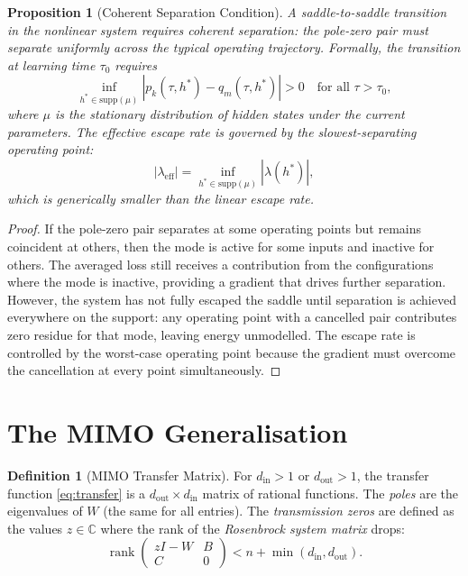 \documentclass[11pt,a4paper]{article}
\newtheorem{proposition}[theorem]{Proposition}
\theoremstyle{definition}
\newtheorem{definition}[theorem]{Definition}
\DeclareMathOperator{\rank}{rank}
\newcommand{\C}{\mathbb{C}}
\begin{document}
\begin{proposition}[Coherent Separation Condition]%
\label{prop:coherent}
A saddle-to-saddle transition in the nonlinear system requires
\emph{coherent separation}: the pole-zero pair must separate
uniformly across the typical operating trajectory. Formally,
the transition at learning time $\tau_0$ requires
\begin{equation}
  \inf_{h^* \in \mathrm{supp}(\mu)}
  |p_k(\tau, h^*) - q_m(\tau, h^*)| > 0
  \quad \text{for all } \tau > \tau_0,
\end{equation}
where $\mu$ is the stationary distribution of hidden states under
the current parameters. The effective escape rate is governed by
the slowest-separating operating point:
\begin{equation}
  |\lambda_{\mathrm{eff}}| = \inf_{h^* \in \mathrm{supp}(\mu)}
  |\lambda(h^*)|,
\end{equation}
which is generically smaller than the linear escape rate.
\end{proposition}

\begin{proof}
If the pole-zero pair separates at some operating points but
remains coincident at others, then the mode is active for some
inputs and inactive for others. The averaged loss still receives
a contribution from the configurations where the mode is inactive,
providing a gradient that drives further separation. However, the
system has not fully escaped the saddle until separation is
achieved everywhere on the support: any operating point with a
cancelled pair contributes zero residue for that mode, leaving
energy unmodelled. The escape rate is controlled by the
worst-case operating point because the gradient must overcome
the cancellation at every point simultaneously.
\end{proof}

\section{The MIMO Generalisation}\label{sec:mimo}

\begin{definition}[MIMO Transfer Matrix]\label{def:mimo_transfer}
For $d_{\mathrm{in}} > 1$ or $d_{\mathrm{out}} > 1$, the transfer
function \eqref{eq:transfer} is a
$d_{\mathrm{out}} \times d_{\mathrm{in}}$ matrix of rational
functions. The \emph{poles} are the eigenvalues of $W$ (the same
for all entries). The \emph{transmission zeros} are defined as
the values $z \in \C$ where the rank of the \emph{Rosenbrock
system matrix} drops:
\begin{equation}
  \rank \begin{pmatrix} zI - W & B \\ C & 0 \end{pmatrix}
  < n + \min(d_{\mathrm{in}}, d_{\mathrm{out}}).
\end{equation}
\end{definition}
\end{document}
